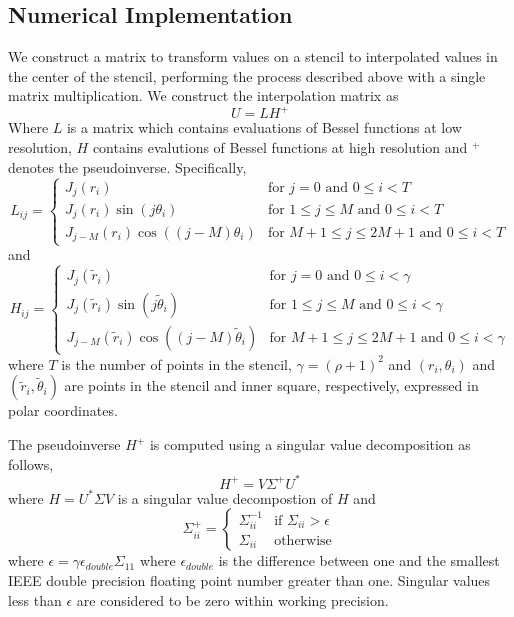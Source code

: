 \documentclass{report}
\begin{document}
\subsection{Numerical Implementation}
We construct a matrix to transform values on a stencil to interpolated values in the center of the stencil, performing the process described above with a single matrix multiplication. We construct the interpolation matrix as
\[
U = L H^{+}
\]
Where $L$ is a matrix which contains evaluations of Bessel functions at low resolution, $H$ contains evalutions of Bessel functions at high resolution and $^{+}$ denotes the pseudoinverse. Specifically,
\[
L_{ij} =\begin{cases}
J_{j}(r_{i}) & \text{for } j = 0 \text{ and } 0 \le i < T\\
J_{j}(r_{i}) \sin{(j \theta_{i})} & \text{for } 1 \le j \le M \text{ and } 0 \le i < T\\
J_{j-M}(r_{i}) \cos{((j-M) \theta_{i})} & \text{for } M+1 \le j \le 2M+1 \text{ and } 0 \le i < T
\end{cases}
\]
and
\[
H_{ij} =\begin{cases}
J_{j}(\tilde{r}_{i}) & \text{for } j = 0 \text{ and } 0 \le i < \gamma\\
J_{j}(\tilde{r}_{i}) \sin{(j \tilde{\theta}_{i})} & \text{for } 1 \le j \le M \text{ and } 0 \le i < \gamma\\
J_{j-M}(\tilde{r}_{i}) \cos{((j-M) \tilde{\theta}_{i})} & \text{for } M+1 \le j \le 2M+1 \text{ and } 0 \le i < \gamma
\end{cases}
\]
where $T$ is the number of points in the stencil, $\gamma = (\rho + 1)^{2}$ and $(r_{i},\theta_{i})$ and $(\tilde{r}_{i},\tilde{\theta}_{i})$ are points in the stencil and inner square, respectively, expressed in polar coordinates.

The pseudoinverse $H^{+}$ is computed using a singular value decomposition as follows,
\[
H^{+} = V \Sigma^{+} U^{*}
\]
where $H = U^{*} \Sigma V$ is a singular value decompostion of $H$ and
\[
\Sigma^{+}_{ii} =\begin{cases}
\Sigma_{ii}^{-1} & \text{if }\Sigma_{ii} > \epsilon\\
\Sigma_{ii} & \text{otherwise}
\end{cases}
\]
where $\epsilon = \gamma \epsilon_{double} \Sigma_{11}$ where $\epsilon_{double}$ is the difference between one and the smallest IEEE double precision floating point number greater than one. Singular values less than $\epsilon$ are considered to be zero within working precision.
\end{document}
